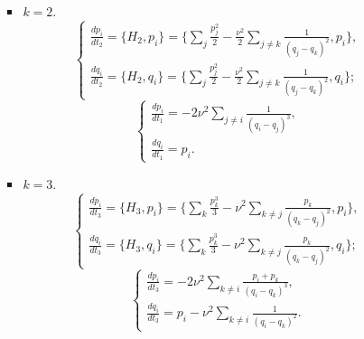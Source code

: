 \documentclass[12pt]{article}
\theoremstyle{definition}
\begin{document}
\begin{enumerate}
\begin{itemize}
\begin{itemize}
\begin{equation}
            \end{equation}
            \item $k=2$.
            \begin{equation}
                \begin{cases}
                    \frac{dp_i}{dt_2}=\{H_2,p_i\}=\{\sum_{j}\limits\frac{p_j^2}{2}-\frac{\nu^2}{2}\sum_{j\neq k}\limits\frac{1}{(q_j-q_k)^2},p_i\},\\
                    \frac{dq_i}{dt_2}=\{H_2,q_i\}=\{\sum_{j}\limits\frac{p_j^2}{2}-\frac{\nu^2}{2}\sum_{j\neq k}\limits\frac{1}{(q_j-q_k)^2},q_i\};
               \end{cases}
            \end{equation} 
             \begin{equation}
                \boxed{\begin{cases}
                    \frac{dp_i}{dt_1}=-2\nu^2\sum_{j\neq i}\limits\frac{1}{(q_i-q_j)^3},\\
                    \frac{dq_i}{dt_1}=p_i.
                \end{cases}}
            \end{equation}
            \item $k=3$.
            \begin{equation}
                \begin{cases}
                    \frac{dp_i}{dt_3}=\{H_3,p_i\}=\{\sum_{k}\limits\frac{p_k^3}{3}
                    -\nu^2\sum_{k\neq j}\limits\frac{p_k}{(q_k-q_j)^2},p_i\},\\
                    \frac{dq_i}{dt_3}=\{H_3,q_i\}=\{\sum_{k}\limits\frac{p_k^3}{3}
                    -\nu^2\sum_{k\neq j}\limits\frac{p_k}{(q_k-q_j)^2},q_i\};
                \end{cases}
            \end{equation}
            \begin{equation}
                \boxed{\begin{cases}
                    \frac{dp_i}{dt_3}=-2\nu^2 \sum_{k\neq i}\limits\frac{p_i+p_k}{(q_i-q_k)^3},\\
                    \frac{dq_i}{dt_3}=p_i-\nu^2 \sum_{k\neq i}\limits\frac{1}{(q_i-q_k)^2}.
                \end{cases}}
            \end{equation}
        \end{itemize}
    \end{itemize}
\end{enumerate}
\end{document}
